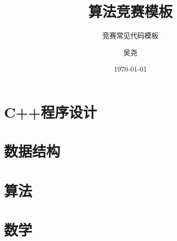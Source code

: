 \documentclass[cn,10pt]{OIBooks}
\title{算法竞赛模板}
\subtitle{竞赛常见代码模板}
\author{吴尧}
\date{\today}
\begin{document}
\maketitle%

%
\tableofcontents%

\mainmatter
\part{C++程序设计}
%

\part{数据结构}

\part{算法}

\part{数学}


\appendix


\end{document}
